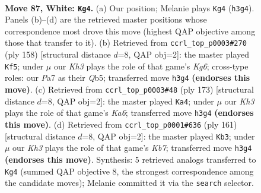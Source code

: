 \documentclass[11pt]{article}
\begin{document}
\clearpage

\begin{figure}[p]\centering
\begin{subfigure}{0.46\textwidth}\centering
\resizebox{\linewidth}{!}{%
\newchessgame
\chessboard[
  setfen={5rk1/P7/3R4/8/8/7K/8/8 w - - 43 87},
  showmover=false,
  pgfstyle=straightmove, color=movearrow, markmove={h3-g4}
]}
\caption{}
\end{subfigure}\hfill
\begin{subfigure}{0.46\textwidth}\centering
\resizebox{\linewidth}{!}{%
\newchessgame
\chessboard[
  setfen={8/8/6K1/1Q6/3kr3/8/8/8 w - - 17 80},
  showmover=false,
  pgfstyle=straightmove, color=movearrow, markmove={g6-f5}
]}
\caption{}
\end{subfigure}
\\[4pt]
\begin{subfigure}{0.46\textwidth}\centering
\resizebox{\linewidth}{!}{%
\newchessgame
\chessboard[
  setfen={8/8/KR6/8/8/k7/8/8 b - - 8 87},
  showmover=false,
  pgfstyle=straightmove, color=movearrow, markmove={a3-a4}
]}
\caption{}
\end{subfigure}\hfill
\begin{subfigure}{0.46\textwidth}\centering
\resizebox{\linewidth}{!}{%
\newchessgame
\chessboard[
  setfen={8/8/8/2K5/2R5/8/1k6/8 b - - 15 81},
  showmover=false,
  pgfstyle=straightmove, color=movearrow, markmove={b2-b3}
]}
\caption{}
\end{subfigure}
\caption{\textbf{Move 87, White: \texttt{Kg4}.} (a) Our position; Melanie plays \texttt{Kg4} (\texttt{h3g4}). Panels (b)--(d) are the retrieved master positions whose correspondence most drove this move (highest QAP objective among those that transfer to it). (b) Retrieved from \texttt{ccrl\_top\_p0003\#270} (ply 158) [structural distance $d$=8, QAP obj=2]: the master played \texttt{Kf5}; under $\mu$ our \emph{Kh3} plays the role of that game's \emph{Kg6}; cross-type roles: our \emph{P}a7 as their \emph{Q}b5; transferred move \texttt{h3g4} \textbf{(endorses this move)}. (c) Retrieved from \texttt{ccrl\_top\_p0003\#48} (ply 173) [structural distance $d$=8, QAP obj=2]: the master played \texttt{Ka4}; under $\mu$ our \emph{Kh3} plays the role of that game's \emph{Ka6}; transferred move \texttt{h3g4} \textbf{(endorses this move)}. (d) Retrieved from \texttt{ccrl\_top\_p0001\#636} (ply 161) [structural distance $d$=8, QAP obj=2]: the master played \texttt{Kb3}; under $\mu$ our \emph{Kh3} plays the role of that game's \emph{Kb7}; transferred move \texttt{h3g4} \textbf{(endorses this move)}. Synthesis: 5 retrieved analogs transferred to \texttt{Kg4} (summed QAP objective 8, the strongest correspondence among the candidate moves); Melanie committed it via the \texttt{search} selector.}
\label{fig:thought-m172}
\end{figure}
\end{document}
